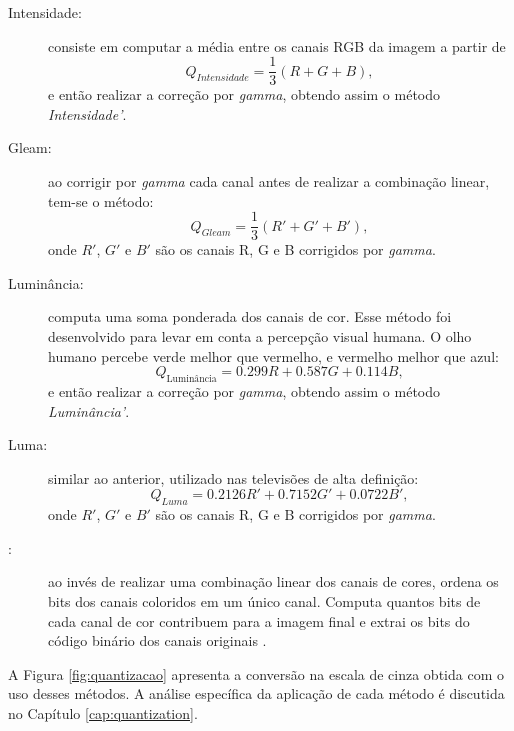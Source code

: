 \begin{description}
\item [Intensidade:] consiste em computar a média entre os canais RGB da imagem a partir de
\begin{equation}
	Q_{Intensidade} = \frac{1}{3}(R + G + B),
  \label{eq:intensidade}
\end{equation}
\noindent e então realizar a correção por \textit{gamma}, obtendo assim o método \emph{Intensidade'}.

\item [Gleam:] ao corrigir por \textit{gamma} cada canal antes de realizar a combinação linear, tem-se o método:
\begin{equation}
	Q_{Gleam} = \frac{1}{3}(R' + G' + B'),
  \label{eq:gleam}
\end{equation}
\noindent onde $R'$, $G'$ e $B'$ são os canais R, G e B corrigidos por \textit{gamma}.

\item [Luminância:] computa uma soma ponderada dos canais de cor. Esse método foi desenvolvido para levar em conta a percepção visual humana. O olho humano percebe verde melhor que vermelho, e vermelho melhor que azul:
\begin{equation}
	Q_{\text{Luminância}} = 0.299R + 0.587G + 0.114B,
  \label{eq:luminancia}
\end{equation}
\noindent e então realizar a correção por \textit{gamma}, obtendo assim o método \emph{Luminância'}.

\item [Luma:]  similar ao anterior, utilizado nas televisões de alta definição:
\begin{equation}
	Q_{Luma} = 0.2126R' + 0.7152G' + 0.0722B',
  \label{eq:luma}
\end{equation}
\noindent onde $R'$, $G'$ e $B'$ são os canais R, G e B corrigidos por \textit{gamma}.

\item [:] ao invés de realizar uma combinação linear dos canais de cores, ordena os bits dos canais coloridos em um único canal. Computa quantos bits de cada canal de cor contribuem para a imagem final e extrai os bits do código binário dos canais originais \cite{Ponti-Jr2013}.

\end{description}

A Figura \ref{fig:quantizacao} apresenta a conversão na escala de cinza obtida com o uso desses métodos. A análise específica da aplicação de cada método é discutida no Capítulo \ref{cap:quantization}.


